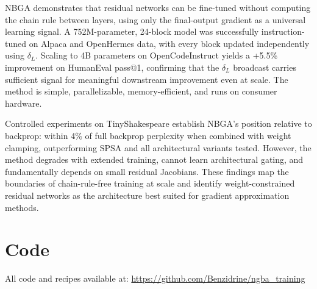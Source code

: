 \documentclass[11pt]{article}
\begin{document}
NBGA demonstrates that residual networks can be fine-tuned without computing the chain rule between layers, using only the final-output gradient as a universal learning signal. A 752M-parameter, 24-block model was successfully instruction-tuned on Alpaca and OpenHermes data, with every block updated independently using $\delta_L$. Scaling to 4B parameters on OpenCodeInstruct yields a +5.5\% improvement on HumanEval pass@1, confirming that the $\delta_L$ broadcast carries sufficient signal for meaningful downstream improvement even at scale. The method is simple, parallelizable, memory-efficient, and runs on consumer hardware.

Controlled experiments on TinyShakespeare establish NBGA's position relative to backprop: within 4\% of full backprop perplexity when combined with weight clamping, outperforming SPSA and all architectural variants tested. However, the method degrades with extended training, cannot learn architectural gating, and fundamentally depends on small residual Jacobians. These findings map the boundaries of chain-rule-free training at scale and identify weight-constrained residual networks as the architecture best suited for gradient approximation methods.

\section*{Code}

All code and recipes available at: \url{https://github.com/Benzidrine/ngba_training}
\end{document}

